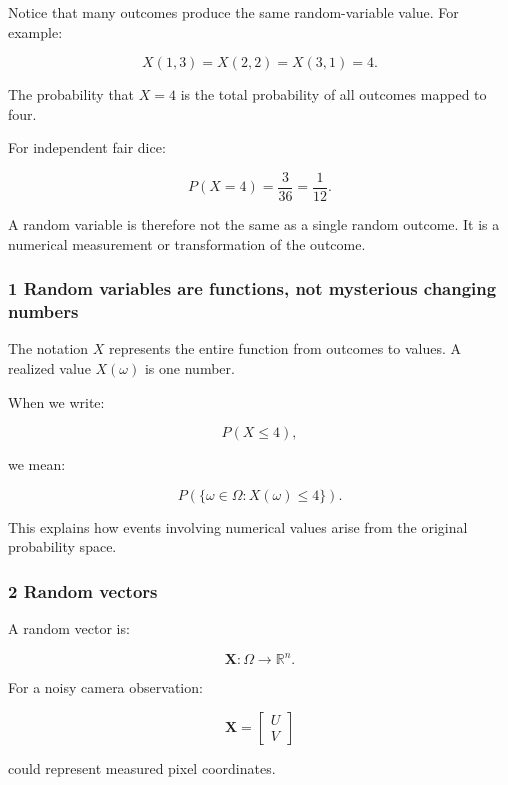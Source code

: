 Notice that many outcomes produce the same random-variable value. For example:

\[
 X(1,3)=X(2,2)=X(3,1)=4.
\]

The probability that \(X=4\) is the total probability of all outcomes mapped to four.

For independent fair dice:

\[
 P(X=4)=\frac3{36}=\frac1{12}.
\]

A random variable is therefore not the same as a single random outcome. It is a numerical measurement or transformation of the outcome.

\subsubsection{1 Random variables are functions, not mysterious changing numbers}\label{02-foundations-ii-ch023-random-variables-are-functions-not-mysterious-changing-numbers}

\hypertarget{02-foundations-ii-ch023-random-variables-are-functions-not-mysterious-changing-numbers}{}

The notation \(X\) represents the entire function from outcomes to values. A realized value \(X(\omega)\) is one number.

When we write:

\[
 P(X\le4),
\]

we mean:

\[
 P(\{\omega\in\Omega:X(\omega)\le4\}).
\]

This explains how events involving numerical values arise from the original probability space.

\subsubsection{2 Random vectors}\label{02-foundations-ii-ch023-random-vectors}

\hypertarget{02-foundations-ii-ch023-random-vectors}{}

A random vector is:

\[
 \mathbf X:\Omega\rightarrow\mathbb R^n.
\]

For a noisy camera observation:

\[
 \mathbf X= \begin{bmatrix} U\\V \end{bmatrix}
\]

could represent measured pixel coordinates.

